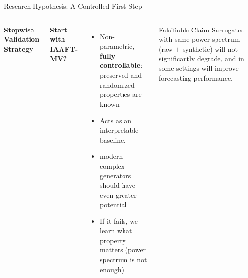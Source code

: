 \documentclass[aspectratio=169,10pt]{beamer}
\begin{document}
\begin{frame}{Research Hypothesis: A Controlled First Step}
  \begin{columns}[T]
      \textbf{Stepwise Validation Strategy}
      \vspace{0.4em}


      \textbf{Start with IAAFT-MV?}
      \begin{itemize}
        \item Non-parametric, \textbf{fully controllable}: preserved
              and randomized properties are known
        \item Acts as an interpretable baseline.
        \item modern complex generators should have even
              greater potential
        \item If it fails, we learn what property
              matters (power spectrum is not enough)
      \end{itemize}
      \vspace{0.4em}
      \begin{alertblock}{Falsifiable Claim}
        \small
        Surrogates with same power spectrum (raw $+$ synthetic) will
        not significantly degrade, and in some settings will
        improve forecasting performance.
      \end{alertblock}
  \end{columns}
\end{frame}

\end{document}
